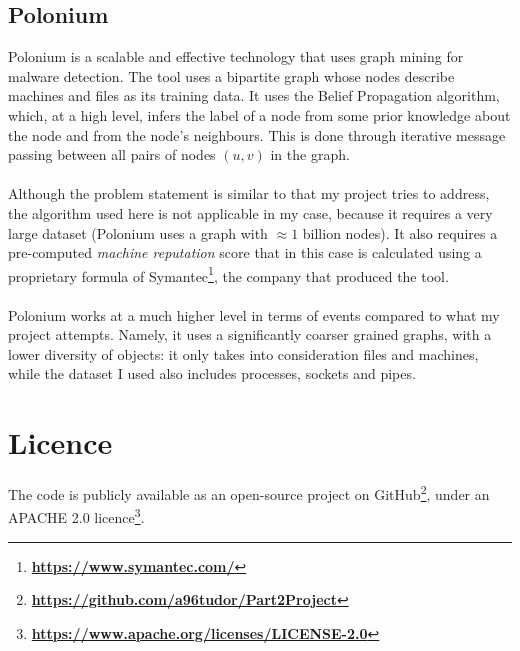 	\subsection{Polonium}
	Polonium is a scalable and effective technology that uses graph mining for malware detection. The tool uses a bipartite graph whose nodes describe machines and files as its training data. It uses the Belief Propagation algorithm, which, at a high level, infers the label of a node from some prior knowledge about the node and from the node's neighbours. This is done through iterative message passing between all pairs of nodes $(u, v)$ in the graph. 
	\\ \\
	Although the problem statement is similar to that my project tries to address, the algorithm used here is not applicable in my case, because it requires a very large dataset (Polonium uses a graph with $\approx 1$ billion nodes). It also requires a pre-computed \textit{machine reputation} score that in this case is calculated using a proprietary formula of Symantec\footnote{\textbf{\url{https://www.symantec.com/}}}, the company that produced the tool. 
	\\ \\
	Polonium works at a much higher level in terms of events compared to what my project attempts. Namely, it uses a significantly coarser grained graphs, with a lower diversity of objects: it only takes into consideration files and machines, while the dataset I used also includes processes, sockets and pipes. 
	
	\section{Licence} 
	The code is publicly available as an open-source project on GitHub\footnote{\textbf{\url{https://github.com/a96tudor/Part2Project}}}, under an APACHE 2.0 licence\footnote{\textbf{\url{https://www.apache.org/licenses/LICENSE-2.0}}}. 

